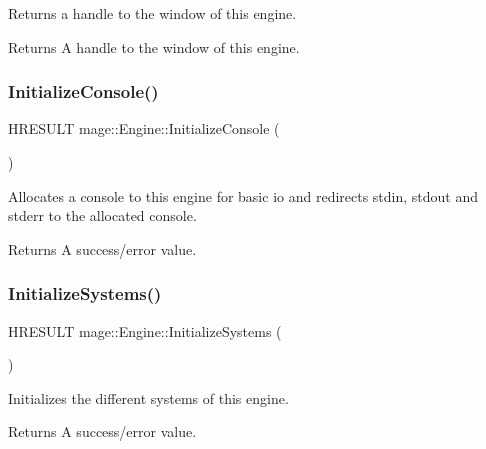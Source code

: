 Returns a handle to the window of this engine.

\begin{DoxyReturn}{Returns}
A handle to the window of this engine. 
\end{DoxyReturn}
\hypertarget{classmage_1_1_engine_a82b2a8f29e537072ede0f2b032f49ded}{}\label{classmage_1_1_engine_a82b2a8f29e537072ede0f2b032f49ded} 
\subsubsection{\texorpdfstring{Initialize\+Console()}{InitializeConsole()}}
{\footnotesize\ttfamily H\+R\+E\+S\+U\+LT mage\+::\+Engine\+::\+Initialize\+Console (\begin{DoxyParamCaption}{ }\end{DoxyParamCaption})\hspace{0.3cm}{\ttfamily [protected]}}

Allocates a console to this engine for basic io and redirects stdin, stdout and stderr to the allocated console.

\begin{DoxyReturn}{Returns}
A success/error value. 
\end{DoxyReturn}
\hypertarget{classmage_1_1_engine_aa691369008f234bfe88bbe0b25f1155e}{}\label{classmage_1_1_engine_aa691369008f234bfe88bbe0b25f1155e} 
\subsubsection{\texorpdfstring{Initialize\+Systems()}{InitializeSystems()}}
{\footnotesize\ttfamily H\+R\+E\+S\+U\+LT mage\+::\+Engine\+::\+Initialize\+Systems (\begin{DoxyParamCaption}{ }\end{DoxyParamCaption})\hspace{0.3cm}{\ttfamily [protected]}}

Initializes the different systems of this engine.

\begin{DoxyReturn}{Returns}
A success/error value. 
\end{DoxyReturn}
\hypertarget{classmage_1_1_engine_afdc1cf0de7880cdcfe766d12e56bc0e3}{}\label{classmage_1_1_engine_afdc1cf0de7880cdcfe766d12e56bc0e3} 
